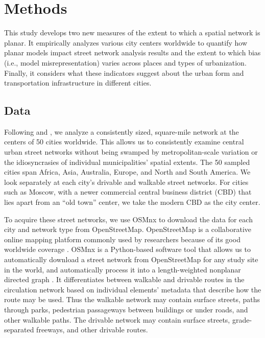 \documentclass[Afour,sageh,times]{sagej}
\begin{document}
\section{Methods}

This study develops two new measures of the extent to which a spatial network is planar. It empirically analyzes various city centers worldwide to quantify how planar models impact street network analysis results and the extent to which bias (i.e., model misrepresentation) varies across places and types of urbanization. Finally, it considers what these indicators suggest about the urban form and transportation infrastructure in different cities.

\subsection{Data}

Following \citet{jacobs_great_1995} and \citet{cardillo_structural_2006}, we analyze a consistently sized, square-mile network at the centers of 50 cities worldwide. This allows us to consistently examine central urban street networks without being swamped by metropolitan-scale variation or the idiosyncrasies of individual municipalities' spatial extents. The 50 sampled cities span Africa, Asia, Australia, Europe, and North and South America. We look separately at each city's drivable and walkable street networks. For cities such as Moscow, with a newer commercial central business district (CBD) that lies apart from an \enquote{old town} center, we take the modern CBD as the city center.

To acquire these street networks, we use OSMnx to download the data for each city and network type from OpenStreetMap. OpenStreetMap is a collaborative online mapping platform commonly used by researchers because of its good worldwide coverage \citep{haklay_how_2010,jokar_arsanjani_openstreetmap_2015}. OSMnx is a Python-based software tool that allows us to automatically download a street network from OpenStreetMap for any study site in the world, and automatically process it into a length-weighted nonplanar directed graph \citep{boeing_osmnx:_2017}. It differentiates between walkable and drivable routes in the circulation network based on individual elements' metadata that describe how the route may be used. Thus the walkable network may contain surface streets, paths through parks, pedestrian passageways between buildings or under roads, and other walkable paths. The drivable network may contain surface streets, grade-separated freeways, and other drivable routes.
\end{document}
